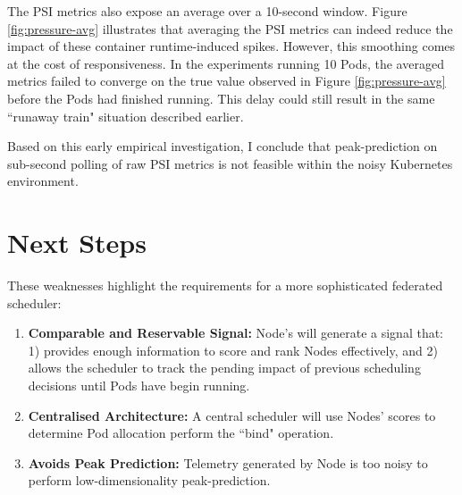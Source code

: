 The PSI metrics also expose an average over a 10-second window. Figure
\ref{fig:pressure-avg} illustrates that averaging the PSI metrics can indeed
reduce the impact of these container runtime-induced spikes. However, this
smoothing comes at the cost of responsiveness. In the experiments running 10
Pods, the averaged metrics failed to converge on the true value observed in
Figure \ref{fig:pressure-avg} before the Pods had finished running. This delay could
still result in the same ``runaway train" situation described earlier.

Based on this early empirical investigation, I conclude that peak-prediction on
sub-second polling of raw PSI metrics is not feasible within the noisy
Kubernetes environment.

\section{Next Steps}
These weaknesses highlight the requirements for a more sophisticated federated
scheduler:
\begin{enumerate}
    \item \textbf{Comparable and Reservable Signal:} Node's will generate a
        signal that: 1) provides enough information to score and rank
        Nodes effectively, and 2) allows the scheduler to track the pending impact
        of previous scheduling decisions until Pods have begin running.
    \item \textbf{Centralised Architecture:} A central scheduler will use
        Nodes' scores to determine Pod allocation perform the ``bind" operation.
    \item \textbf{Avoids Peak Prediction:} Telemetry generated by Node is too
        noisy to perform low-dimensionality peak-prediction.
\end{enumerate}




%
%
%

